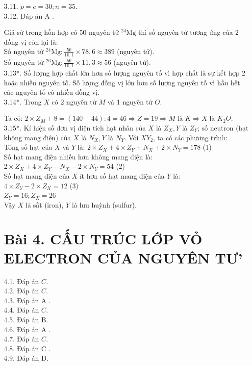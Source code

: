 \documentclass[10pt]{article}
\begin{document}
3.11. $p=e=30 ; n=35$.\\
3.12. Đáp án A .

Giả sử trong hỗn hợp có 50 nguyên tử ${ }^{24} \mathrm{Mg}$ thì số nguyên tử tương ứng của 2 đồng vị còn lại là:\\
Số nguyên tử ${ }^{24} \mathrm{Mg}: \frac{50}{10,1} \times 78,6 \approx 389$ (nguyên tử).\\
Số nguyên tử ${ }^{26} \mathrm{Mg}: \frac{50}{10,1} \times 11,3 \approx 56$ (nguyên tử).\\
3.13*. Số lượng hợp chất lớn hơn số lượng nguyên tố vì hợp chất là sự kết hợp 2 hoặc nhiều nguyên tố. Số lượng đồng vị lớn hơn số lượng nguyên tố vì hầu hết các nguyên tố có nhiều đồng vị.\\
3.14*. Trong $X$ có 2 nguyên tử $M$ và 1 nguyên tử $O$.

Ta có: $2 \times Z_{M}+8=(140+44): 4=46 \Rightarrow Z=19 \Rightarrow M$ là $K \Rightarrow X$ là $K_{2} O$.\\
3.15*. Kí hiệu số đơn vị điện tích hạt nhân của $X$ là $Z_{X}, Y$ là $Z_{Y}$; số neutron (hạt không mang điện) của $X$ là $N_{X}, Y$ là $N_{Y}$. Với $X Y_{2}$, ta có các phương trình:\\
Tổng số hạt của $X$ và $Y$ là: $2 \times Z_{X}+4 \times Z_{Y}+N_{X}+2 \times N_{Y}=178$ (1)\\
Số hạt mang điện nhiều hơn không mang điện là:\\
$2 \times Z_{X}+4 \times Z_{Y}-N_{X}-2 \times N_{Y}=54$ (2)\\
Số hạt mang điện của $X$ ít hơn số hạt mang điện của $Y$ là:\\
$4 \times Z_{Y}-2 \times Z_{X}=12$ (3)\\
$Z_{Y}=16 ; Z_{X}=26$\\
Vậy $X$ là sắt (iron), $Y$ là lưu huỳnh (sulfur).

\section*{Bài 4. CẤU TRÚC LỚP VỎ ELECTRON CỦA NGUYÊN TƯ'}
4.1. Đáp án $C$.\\
4.2. Đáp án $C$.\\
4.3. Đáp án A .\\
4.4. Đáp án $C$.\\
4.5. Đáp án B.\\
4.6. Đáp án A .\\
4.7. Đáp án $C$.\\
4.8. Đáp án C .\\
4.9. Đáp án D.
\end{document}
